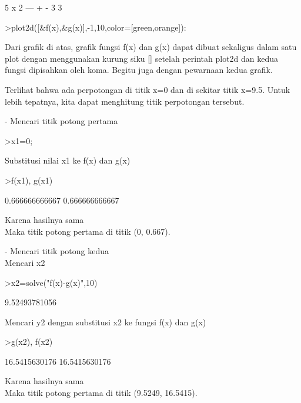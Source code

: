 \documentclass{article}
\begin{document}
\begin{eulernotebook}
\begin{eulercomment}
\begin{eulercomment}
\begin{eulercomment}
\begin{eulercomment}
\begin{eulercomment}
\begin{eulercomment}
\begin{euleroutput}
                                 5 x   2
                                 --- + -
                                  3    3
  
\end{euleroutput}
\begin{eulerprompt}
>plot2d([&f(x),&g(x)],-1,10,color=[green,orange]):
\end{eulerprompt}
\begin{eulercomment}
Dari grafik di atas, grafik fungsi f(x) dan g(x) dapat dibuat
sekaligus dalam satu plot dengan menggunakan kurung siku [] setelah
perintah plot2d dan kedua fungsi dipisahkan oleh koma. Begitu juga
dengan pewarnaan kedua grafik.

Terlihat bahwa ada perpotongan di titik x=0 dan di sekitar titik
x=9.5. Untuk lebih tepatnya, kita dapat menghitung titik perpotongan
tersebut.

- Mencari titik potong pertama
\end{eulercomment}
\begin{eulerprompt}
>x1=0;
\end{eulerprompt}
\begin{eulercomment}
Substitusi nilai x1 ke f(x) dan g(x)
\end{eulercomment}
\begin{eulerprompt}
>f(x1), g(x1)
\end{eulerprompt}
\begin{euleroutput}
  0.666666666667
  0.666666666667
\end{euleroutput}
\begin{eulercomment}
Karena hasilnya sama\\
Maka titik potong pertama di titik (0, 0.667).

- Mencari titik potong kedua\\
Mencari x2
\end{eulercomment}
\begin{eulerprompt}
>x2=solve("f(x)-g(x)",10)
\end{eulerprompt}
\begin{euleroutput}
  9.52493781056
\end{euleroutput}
\begin{eulercomment}
Mencari y2 dengan substitusi x2 ke fungsi f(x) dan g(x)
\end{eulercomment}
\begin{eulerprompt}
>g(x2), f(x2)
\end{eulerprompt}
\begin{euleroutput}
  16.5415630176
  16.5415630176
\end{euleroutput}
\begin{eulercomment}
Karena hasilnya sama\\
Maka titik potong pertama di titik (9.5249, 16.5415).


\end{eulercomment}
\end{eulercomment}
\end{eulercomment}
\end{eulercomment}
\end{eulercomment}
\end{eulercomment}
\end{eulercomment}
\end{eulernotebook}
\end{document}

